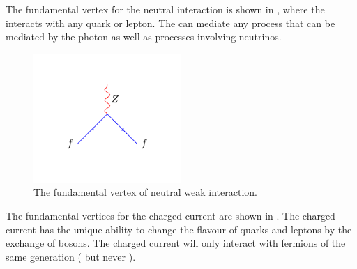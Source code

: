 The fundamental vertex for the neutral interaction is shown in
, where the \PZ interacts with any quark or lepton.
The \PZ can mediate any process that can be mediated by the photon as well as
processes involving neutrinos.
\begin{figure}[htbp]
  \centering
  \includegraphics[width=0.5\textwidth]{weak_neut_process}
  \caption{The fundamental vertex of neutral weak interaction.\label{fig:neutral}}
\end{figure}
The fundamental vertices for the charged current are shown in
. The charged current has the unique ability to change the
flavour of quarks and leptons by the exchange of \PW bosons. The charged current
will only interact with fermions of the same generation
(\HepProcess{\Pelectron\to\Pnue} but never
\HepProcess{\Pelectron\to\Pnum}).

